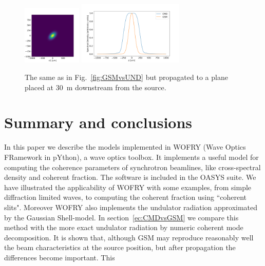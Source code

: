 \documentclass{iopconfser}
\begin{document}
\begin{figure}[H]
    \includegraphics[width=0.25\textwidth]{figures/GSM_V-propagated.png}
    \includegraphics[width=0.45\textwidth]{figures/SD_V-propagated.png}

        
    \caption{The same as in Fig.~\ref{fig:GSMvsUND} but propagated to a plane placed at \SI{30}{m} downstream from the source.
    }
    \label{fig:GSMvsUND-propagated}
\end{figure}

\section{Summary and conclusions}
\label{sec:summary}
In this paper we describe the models implemented in WOFRY (Wave Optics FRamework in pYthon), a wave optics toolbox. It implements a useful model for computing the coherence parameters of synchrotron beamlines, like cross-spectral density and coherent fraction. The software is included in the OASYS \citep{OASYS} suite. We have illustrated the applicability of WOFRY with some examples, from simple diffraction limited waves, to computing the coherent fraction using ``coherent slits". Moreover WOFRY also implements the undulator radiation approximated by the Gaussian Shell-model. In section~\ref{ec:CMDvsGSM} we compare this method with the more exact undulator radiation by numeric coherent mode decomposition. It is shown that, although GSM may reproduce reasonably well the beam characteristics at the source position, but after propagation the differences become important. This 










%

\end{document}
